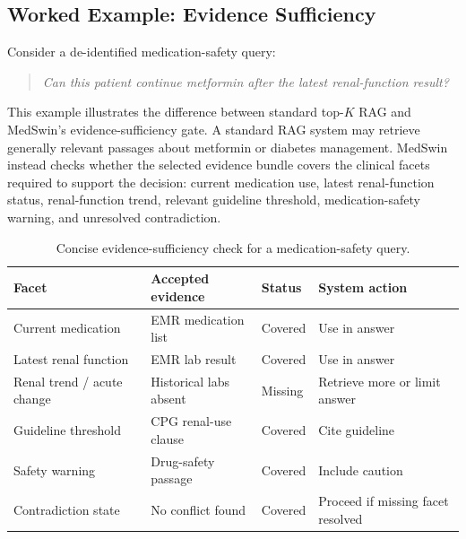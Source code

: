 \documentclass[conference]{IEEEtran}
\begin{document}

\subsection{Worked Example: Evidence Sufficiency}
\label{subsec:worked-example}

Consider a de-identified medication-safety query:

\begin{quote}
\emph{Can this patient continue metformin after the latest renal-function result?}
\end{quote}

This example illustrates the difference between standard top-$K$ RAG and MedSwin's evidence-sufficiency gate. A standard RAG system may retrieve generally relevant passages about metformin or diabetes management. MedSwin instead checks whether the selected evidence bundle covers the clinical facets required to support the decision: current medication use, latest renal-function status, renal-function trend, relevant guideline threshold, medication-safety warning, and unresolved contradiction.

\begin{table}[h!]
\centering
\caption{Concise evidence-sufficiency check for a medication-safety query.}
\label{tab:worked-example-sufficiency}
\scriptsize
\begin{tabularx}{\linewidth}{X X l X}
\toprule
\textbf{Facet} & \textbf{Accepted evidence} & \textbf{Status} & \textbf{System action} \\
\midrule
Current medication & EMR medication list & Covered & Use in answer \\
Latest renal function & EMR lab result & Covered & Use in answer \\
Renal trend / acute change & Historical labs absent & Missing & Retrieve more or limit answer \\
Guideline threshold & CPG renal-use clause & Covered & Cite guideline \\
Safety warning & Drug-safety passage & Covered & Include caution \\
Contradiction state & No conflict found & Covered & Proceed if missing facet resolved \\
\bottomrule
\end{tabularx}
\end{table}
\end{document}
